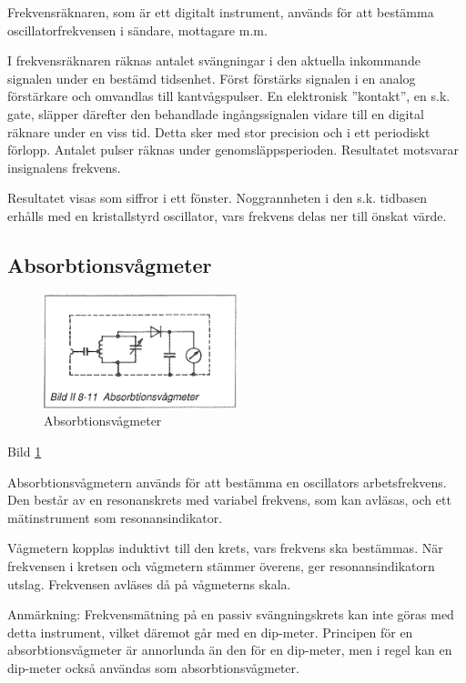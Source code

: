 Frekvensräknaren, som är ett digitalt instrument, används för att
bestämma oscillatorfrekvensen i sändare, mottagare m.m.

I frekvensräknaren räknas antalet svängningar i den aktuella
inkommande signalen under en bestämd tidsenhet. Först förstärks
signalen i en analog förstärkare och omvandlas till kantvågspulser. En
elektronisk ''kontakt'', en s.k. gate, släpper därefter den behandlade
ingångssignalen vidare till en digital räknare under en viss
tid. Detta sker med stor precision och i ett periodiskt
förlopp. Antalet pulser räknas under genomsläppsperioden. Resultatet
motsvarar insignalens frekvens.

Resultatet visas som siffror i ett fönster.  Noggrannheten i den
s.k. tidbasen erhålls med en kristallstyrd oscillator, vars frekvens
delas ner till önskat värde.

\begin{rev-raderas}
\subsection{Absorbtionsvågmeter}

\begin{figure}
  \includegraphics[width=0.5\textwidth]{images/bild_2_8-11}
  \caption{Absorbtionsvågmeter}
  \label{fig:bildII8-11}
\end{figure}

Bild \ref{fig:bildII8-11}

Absorbtionsvågmetern används för att bestämma en oscillators
arbetsfrekvens. Den består av en resonanskrets med variabel frekvens,
som kan avläsas, och ett mätinstrument som resonansindikator.

Vågmetern kopplas induktivt till den krets, vars frekvens ska
bestämmas. När frekvensen i kretsen och vågmetern stämmer överens, ger
resonansindikatorn utslag. Frekvensen avläses då på vågmeterns skala.

Anmärkning: Frekvensmätning på en passiv svängningskrets kan inte
göras med detta instrument, vilket däremot går med en
dip-meter. Principen för en absorbtionsvågmeter är annorlunda än den
för en dip-meter, men i regel kan en dip-meter också användas som
absorbtionsvågmeter.
\end{rev-raderas}


